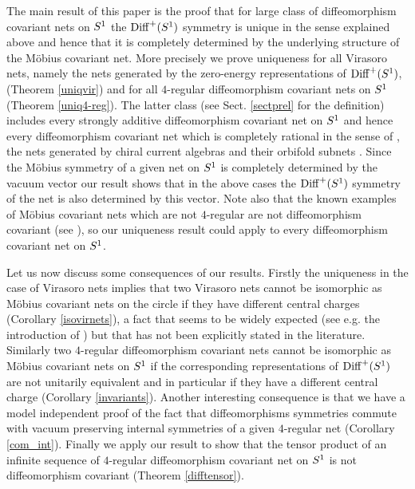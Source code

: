 \documentclass[12pt]{article}
\begin{document}
The main result of this paper is the proof that for large class of
diffeomorphism covariant nets on $\s1$ the ${{\rm Diff}^+(S^1)}$ symmetry is unique
in the sense explained above and hence that it is completely determined by
the underlying structure of the M\"obius covariant net. More precisely we
prove uniqueness for all Virasoro nets, namely the nets generated by the
zero-energy representations of ${{\rm Diff}^+(S^1)}$, (Theorem \ref{uniqvir}) and for
all $4$-regular diffeomorphism covariant nets on $\s1$ (Theorem
\ref{uniq4-reg}).  The latter class (see Sect. \ref{sectprel} for the
definition) includes every strongly additive diffeomorphism covariant net
on $\s1$ and hence every diffeomorphism covariant net which is completely
rational in the sense of \cite{KLM}, the nets generated by chiral current
algebras \cite{BS-M,GLW,Tol97,Was A} and their orbifold subnets \cite{xu
2003}.  
Since the M\"obius symmetry of a given net on $\s1$ is completely
determined by the vacuum vector \cite[Theorem 2.19]{FrG} our result shows
that in the above cases the ${{\rm Diff}^+(S^1)}$ symmetry of the net is also determined
by this vector.  Note also that the known examples of M\"obius covariant
nets which are not $4$-regular are not diffeomorphism covariant (see
\cite{GLW,koester03a}), so our uniqueness result could apply to every
diffeomorphism covariant net on $\s1$.


Let us now discuss some consequences of our results. Firstly the
uniqueness in the case of Virasoro nets implies that two Virasoro nets
cannot be isomorphic as M\"obius covariant nets on the circle if they have
different central charges (Corollary \ref{isovirnets}), a fact that seems
to be widely expected (see e.g. the introduction of \cite{BS-M}) but
that has not been explicitly stated in the literature. Similarly two
$4$-regular diffeomorphism covariant nets cannot be isomorphic as
M\"obius covariant nets on $\s1$ if the corresponding representations of
${{\rm Diff}^+(S^1)}$ are not unitarily equivalent and in particular if they have a
different central charge (Corollary \ref{invariants}).  Another
interesting consequence is that we have a model independent proof of the
fact that diffeomorphisms symmetries commute with vacuum preserving
internal symmetries of a given $4$-regular net (Corollary \ref{com_int}).
Finally we apply our result to show that the tensor product of an infinite
sequence of $4$-regular diffeomorphism covariant net on $\s1$ is not
diffeomorphism covariant (Theorem \ref{difftensor}).
\end{document}
